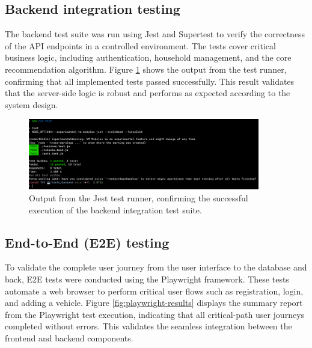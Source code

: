 \subsection{Backend integration testing}
The backend test suite was run using Jest and Supertest to verify the correctness of the API endpoints in a controlled environment. The tests cover critical business logic, including authentication, household management, and the core recommendation algorithm. Figure \ref{fig:jest-results} shows the output from the test runner, confirming that all implemented tests passed successfully. This result validates that the server-side logic is robust and performs as expected according to the system design.

\begin{figure}[H]
    \centering
    \includegraphics[width=0.9\textwidth]{images/results/jest_test_results.png}
    \caption{Output from the Jest test runner, confirming the successful execution of the backend integration test suite.}
    \label{fig:jest-results}
\end{figure}

\subsection{End-to-End (E2E) testing}
To validate the complete user journey from the user interface to the database and back, E2E tests were conducted using the Playwright framework. These tests automate a web browser to perform critical user flows such as registration, login, and adding a vehicle. Figure \ref{fig:playwright-results} displays the summary report from the Playwright test execution, indicating that all critical-path user journeys completed without errors. This validates the seamless integration between the frontend and backend components.

